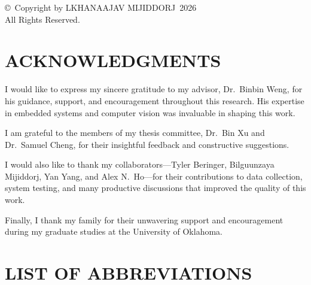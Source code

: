 \documentclass[12pt,letterpaper,oneside]{report}
\newcommand{\authorname}{Lkhanaajav Mijiddorj}
\newcommand{\thesisyear}{2026}
\newcommand{\advisorname}{Dr.\ Binbin Weng}
\begin{document}
\thispagestyle{empty}
\vspace*{\fill}
\begin{center}
\copyright\ Copyright by \MakeUppercase{\authorname}\ \thesisyear\\
All Rights Reserved.
\end{center}
\vspace*{\fill}
\newpage

\chapter*{ACKNOWLEDGMENTS}

I would like to express my sincere gratitude to my advisor, \advisorname, for his guidance, support, and encouragement throughout this research. His expertise in embedded systems and computer vision was invaluable in shaping this work.

I am grateful to the members of my thesis committee, Dr.\ Bin Xu and Dr.\ Samuel Cheng, for their insightful feedback and constructive suggestions.

I would also like to thank my collaborators---Tyler Beringer, Bilguunzaya Mijiddorj, Yan Yang, and Alex N.\ Ho---for their contributions to data collection, system testing, and many productive discussions that improved the quality of this work.

Finally, I thank my family for their unwavering support and encouragement during my graduate studies at the University of Oklahoma.

\newpage

\tableofcontents
\newpage

\listoftables
{}
\newpage

\listoffigures
{}
\newpage

\chapter*{LIST OF ABBREVIATIONS}
\end{document}
